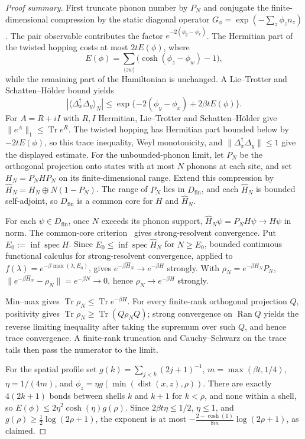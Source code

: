 \documentclass[11pt]{article}
\theoremstyle{definition}
\theoremstyle{remark}
\DeclareMathOperator{\Tr}{Tr}
\DeclareMathOperator{\spec}{spec}
\DeclareMathOperator{\dist}{dist}
\begin{document}
\begin{proof}[Proof summary]
First truncate phonon number by $P_N$ and conjugate the finite-dimensional compression by the static diagonal operator $G_\phi=\exp(-\sum_z\phi_zn_z)$. The pair observable contributes the factor $e^{-2(\phi_y-\phi_x)}$. The Hermitian part of the twisted hopping costs at most $2tE(\phi)$, where
\[
 E(\phi)=\sum_{\langle zw\rangle}\bigl(\cosh(\phi_z-\phi_w)-1\bigr),
\]
while the remaining part of the Hamiltonian is unchanged. A Lie--Trotter and Schatten--H\"older bound yields
\[
 |\langle\Delta_x^\dagger\Delta_y\rangle_N|
 \leq\exp\{-2(\phi_y-\phi_x)+2\beta t E(\phi)\}.
\]
For $A=R+iI$ with $R,I$ Hermitian, Lie--Trotter and Schatten--H\"older give $\|e^A\|_1\leq\Tr e^R$. The twisted hopping has Hermitian part bounded below by $-2tE(\phi)$, so this trace inequality, Weyl monotonicity, and $\|\Delta_x^\dagger\Delta_y\|\leq1$ give the displayed estimate.
For the unbounded-phonon limit, let $P_N$ be the orthogonal projection onto states with at most $N$ phonons at each site, and set $H_N=P_NHP_N$ on its finite-dimensional range. Extend this compression by $\widehat H_N=H_N\oplus N(1-P_N)$. The range of $P_N$ lies in $D_{\mathrm{fin}}$, and each $\widehat H_N$ is bounded self-adjoint, so $D_{\mathrm{fin}}$ is a common core for $H$ and $\widehat H_N$.

For each $\psi\in D_{\mathrm{fin}}$, once $N$ exceeds its phonon support, $\widehat H_N\psi=P_NH\psi\to H\psi$ in norm. The common-core criterion~\cite[Sec.~VIII.7]{reedSimon} gives strong-resolvent convergence. Put $E_0:=\inf\spec H$. Since $E_0\leq\inf\spec\widehat H_N$ for $N\geq E_0$, bounded continuous functional calculus for strong-resolvent convergence, applied to $f(\lambda)=e^{-\beta\max(\lambda,E_0)}$, gives $e^{-\beta\widehat H_N}\to e^{-\beta H}$ strongly. With $\rho_N=e^{-\beta H_N}P_N$, $\|e^{-\beta\widehat H_N}-\rho_N\|=e^{-\beta N}\to0$, hence $\rho_N\to e^{-\beta H}$ strongly.

Min--max gives $\Tr\rho_N\leq\Tr e^{-\beta H}$. For every finite-rank orthogonal projection $Q$, positivity gives $\Tr\rho_N\geq\Tr(Q\rho_NQ)$; strong convergence on $\operatorname{Ran}Q$ yields the reverse limiting inequality after taking the supremum over such $Q$, and hence trace convergence. A finite-rank truncation and Cauchy--Schwarz on the trace tails then pass the numerator to the limit.

For the spatial profile set $g(k)=\sum_{j<k}(2j+1)^{-1}$, $m=\max(\beta t,1/4)$, $\eta=1/(4m)$, and $\phi_z=\eta g(\min(\dist(x,z),\rho))$. There are exactly $4(2k+1)$ bonds between shells $k$ and $k+1$ for $k<\rho$, and none within a shell, so $E(\phi)\leq2\eta^2\cosh(\eta)g(\rho)$. Since $2\beta t\eta\leq1/2$, $\eta\leq1$, and $g(\rho)\geq\frac12\log(2\rho+1)$, the exponent is at most $-\frac{2-\cosh(1)}{8m}\log(2\rho+1)$, as claimed.
\end{proof}
\end{document}
